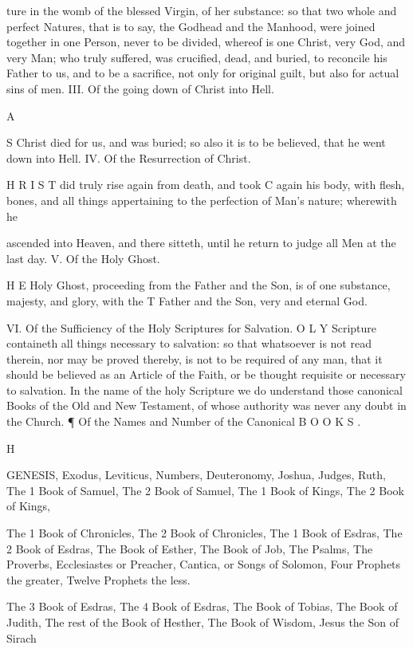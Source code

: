 ture in the womb of the blessed Virgin, of her substance: so that two whole and perfect Natures, that is to say, the Godhead and the Manhood, were joined together in one Person, never to be divided, whereof is one Christ, very God, and very Man; who truly suffered, was crucified, dead, and buried, to reconcile his Father to us, and to be a sacrifice, not only for original guilt, but also for actual sins of men. III. Of the going down of Christ into Hell.

A

S Christ died for us, and was buried; so also it is to be believed, that he went down into Hell. IV. Of the Resurrection of Christ.

H R I S T did truly rise again from death, and took C again his body, with flesh, bones, and all things appertaining to the perfection of Man’s nature; wherewith he

ascended into Heaven, and there sitteth, until he return to judge all Men at the last day. V. Of the Holy Ghost.

H E Holy Ghost, proceeding from the Father and the Son, is of one substance, majesty, and glory, with the T Father and the Son, very and eternal God.

VI. Of the Sufficiency of the Holy Scriptures for Salvation. O L Y Scripture containeth all things necessary to salvation: so that whatsoever is not read therein, nor may be proved thereby, is not to be required of any man, that it should be believed as an Article of the Faith, or be thought requisite or necessary to salvation. In the name of the holy Scripture we do understand those canonical Books of the Old and New Testament, of whose authority was never any doubt in the Church. ¶ Of the Names and Number of the Canonical B O O K S .

H

GENESIS, Exodus, Leviticus, Numbers, Deuteronomy, Joshua, Judges, Ruth, The 1 Book of Samuel, The 2 Book of Samuel, The 1 Book of Kings, The 2 Book of Kings,

The 1 Book of Chronicles, The 2 Book of Chronicles, The 1 Book of Esdras, The 2 Book of Esdras, The Book of Esther, The Book of Job, The Psalms, The Proverbs, Ecclesiastes or Preacher, Cantica, or Songs of Solomon, Four Prophets the greater, Twelve Prophets the less.

The 3 Book of Esdras, The 4 Book of Esdras, The Book of Tobias, The Book of Judith, The rest of the Book of Hesther, The Book of Wisdom, Jesus the Son of Sirach

